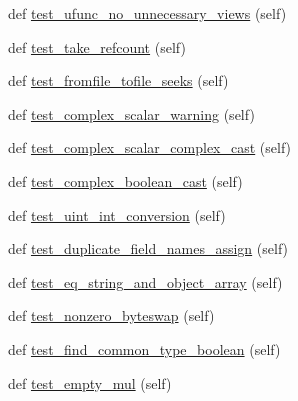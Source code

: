 \begin{DoxyCompactItemize}
\item 
def \hyperlink{classnumpy_1_1core_1_1tests_1_1test__regression_1_1TestRegression_a27c6d96b937206140f7e9d0f4e9a8417}{test\+\_\+ufunc\+\_\+no\+\_\+unnecessary\+\_\+views} (self)
\item 
def \hyperlink{classnumpy_1_1core_1_1tests_1_1test__regression_1_1TestRegression_a79a481232c36a1a86c43aafc91e6808d}{test\+\_\+take\+\_\+refcount} (self)
\item 
def \hyperlink{classnumpy_1_1core_1_1tests_1_1test__regression_1_1TestRegression_a3bdb1006d8903d74421b7f5f21060521}{test\+\_\+fromfile\+\_\+tofile\+\_\+seeks} (self)
\item 
def \hyperlink{classnumpy_1_1core_1_1tests_1_1test__regression_1_1TestRegression_ac0176dcb5d4ffba67fe7b22ce4656c43}{test\+\_\+complex\+\_\+scalar\+\_\+warning} (self)
\item 
def \hyperlink{classnumpy_1_1core_1_1tests_1_1test__regression_1_1TestRegression_a56108a8a47e0fa41e2a3a70224e5ab67}{test\+\_\+complex\+\_\+scalar\+\_\+complex\+\_\+cast} (self)
\item 
def \hyperlink{classnumpy_1_1core_1_1tests_1_1test__regression_1_1TestRegression_a9d344ea2d07719f2be9491e2488d2a86}{test\+\_\+complex\+\_\+boolean\+\_\+cast} (self)
\item 
def \hyperlink{classnumpy_1_1core_1_1tests_1_1test__regression_1_1TestRegression_a76cf22fad2c740f08f121b57160a369f}{test\+\_\+uint\+\_\+int\+\_\+conversion} (self)
\item 
def \hyperlink{classnumpy_1_1core_1_1tests_1_1test__regression_1_1TestRegression_af69ef9efd34e5846fe6a6f9664ea99ac}{test\+\_\+duplicate\+\_\+field\+\_\+names\+\_\+assign} (self)
\item 
def \hyperlink{classnumpy_1_1core_1_1tests_1_1test__regression_1_1TestRegression_a41089ad1819192d2a2f615c33da0039e}{test\+\_\+eq\+\_\+string\+\_\+and\+\_\+object\+\_\+array} (self)
\item 
def \hyperlink{classnumpy_1_1core_1_1tests_1_1test__regression_1_1TestRegression_af5d10252923cc7bf0e8cb27d02cf0891}{test\+\_\+nonzero\+\_\+byteswap} (self)
\item 
def \hyperlink{classnumpy_1_1core_1_1tests_1_1test__regression_1_1TestRegression_a3d006235bc1ea9f92249eb942372e6a8}{test\+\_\+find\+\_\+common\+\_\+type\+\_\+boolean} (self)
\item 
def \hyperlink{classnumpy_1_1core_1_1tests_1_1test__regression_1_1TestRegression_a67c9ae7684fbf399fc3fba82c89fccb4}{test\+\_\+empty\+\_\+mul} (self)
\item 

\end{DoxyCompactItemize}

